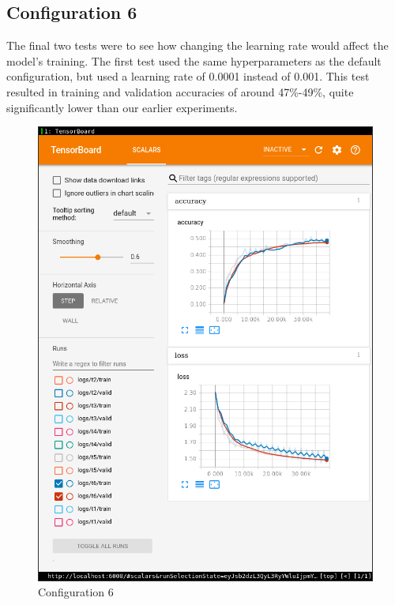\documentclass[11pt]{article}
\begin{document}
\subsection*{Configuration 6}
The final two tests were to see how changing the learning rate would affect the model's training.
The first test used the same hyperparameters as the default configuration, but used a learning rate of 0.0001 instead of 0.001.
This test resulted in training and validation accuracies of around 47\%-49\%, quite significantly
lower than our earlier experiments.
\begin{figure}[H]
	\centering
	\includegraphics[width=0.6 \textwidth]{figure/t6.png}
	\caption{Configuration 6}
	\label{fig:t6}
\end{figure}
\end{document}
